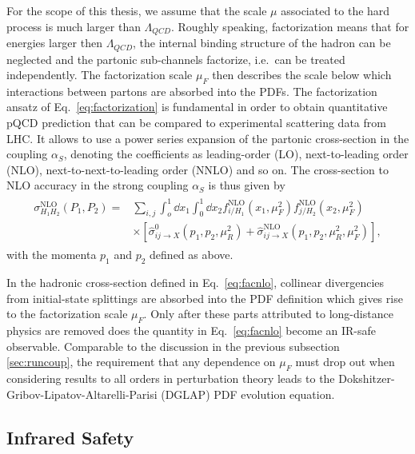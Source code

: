  For the scope of this thesis,
we assume that the scale $\mu$ associated to the hard process is much
larger than $\Lambda_{QCD}$. Roughly speaking,
factorization means that for energies larger then $\Lambda_{QCD}$,
the internal binding structure of
the hadron can be neglected and the partonic sub-channels factorize,
i.e.~can be treated independently. The factorization scale $\mu_F$
then describes the scale below which interactions between partons are
absorbed into the PDFs. The factorization ansatz of Eq.~\eqref{eq:factorization} is
fundamental in order to obtain quantitative pQCD prediction that can be
compared to experimental scattering data from LHC. It allows to use a
power series expansion of the
partonic cross-section in the coupling $\alpha_S$, denoting the coefficients as leading-order
(LO), next-to-leading order (NLO), next-to-next-to-leading order
(NNLO) and so on. The cross-section to NLO accuracy in the strong coupling
$\alpha_S$ is thus given by
\begin{align}\label{eq:facnlo}
\begin{split}
  \sigma^{\text{NLO}}_{H_1 H_2}(P_1,P_2) =& \sum_{i,j}\int_o^1\dd x_1 \int_0^1 \dd
  x_2f^{\text{NLO}}_{i/H_1}(x_1,\mu_F^2)f^{\text{NLO}}_{j/H_2}(x_2,\mu_F^2)\\
&\times \left[ \hat \sigma^0_{ij\rightarrow
    X}(p_1,p_2,\mu_R^2)+\hat \sigma^{\text{NLO}}_{ij\rightarrow
    X}(p_1,p_2,\mu_R^2,\mu_F^2)\right],
\end{split}
\end{align}
with the momenta $p_1$ and $p_2$ defined as above. 

In the hadronic cross-section defined in
Eq.~\eqref{eq:facnlo}, collinear divergencies from initial-state
splittings are absorbed into the PDF definition which gives rise to
the factorization scale $\mu_F$. Only after these parts
attributed to long-distance physics are removed does the quantity in
Eq.~\eqref{eq:facnlo} become an IR-safe observable. Comparable to the
discussion in the previous subsection \ref{sec:runcoup}, the
requirement that any dependence on $\mu_F$ must drop out when
considering results to all orders in perturbation theory leads to the
Dokshitzer-Gribov-Lipatov-Altarelli-Parisi
\cite{Dokshitzer:1977sg,Gribov:1972ri,Altarelli:1977zs} (DGLAP) PDF
evolution equation.


\subsection{Infrared Safety}


